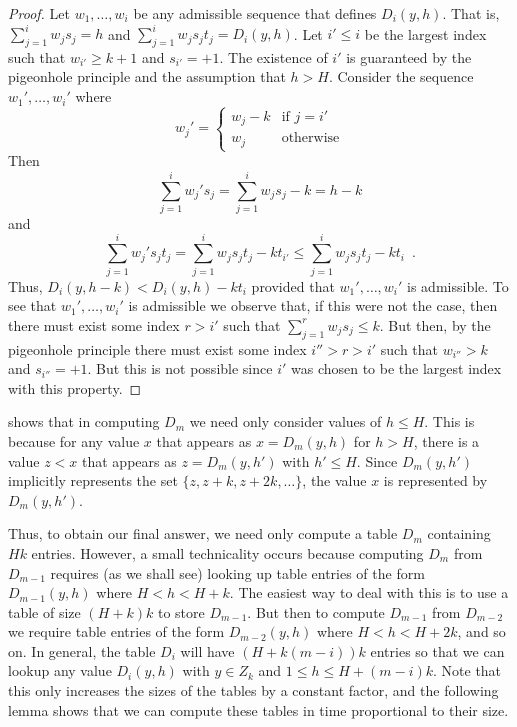 \documentclass[11pt,a4paper]{article}
\begin{document}
\begin{proof}
Let $w_1,\ldots,w_i$ be any admissible sequence that defines
$D_i(y,h)$.  That is,  $\sum_{j=1}^iw_js_j = h$ and $\sum_{j=1}^i w_js_jt_j
= D_i(y,h)$.  Let $i'\le i$ be the largest index such that
$w_{i'}\ge k+1$ and $s_{i'}=+1$.  The existence of $i'$ is guaranteed
by the pigeonhole principle and the
assumption that $h>H$.  Consider the sequence $w_1',\ldots,w_i'$ where
\[
     w_j' = \left\{ \begin{array}{ll}
            w_j-k & \mbox{if $j=i'$} \\
            w_j & \mbox{otherwise}  \end{array} \right.
\]
Then
\[
  \sum_{j=1}^i w_j's_j = \sum_{j=1}^i w_js_j - k = h-k
\]
and
\[
   \sum_{j=1}^i w_j's_jt_j = \sum_{j=1}^i w_js_jt_j - kt_{i'} 
    \le \sum_{j=1}^i w_js_jt_j - kt_{i} \enspace . 
\]
Thus, $D_i(y,h-k) < D_i(y,h) - kt_i$ provided that $w_1',\ldots,w_i'$
is admissible.  To see that $w_1',\ldots,w_i'$ is admissible we
observe that, if this were not the case, then there must exist some
index $r>i'$ such that $\sum_{j=1}^r w_js_j \le k$.  But then, by the
pigeonhole principle there
must exist some index $i''>r>i'$ such that $w_{i''}>k$ and
$s_{i''}=+1$.  But this is not possible since $i'$ was chosen to be
the largest index with this property.
\end{proof}

 shows that in computing $D_m$ we need only consider
values of $h\le H$.  This is because for any value $x$ that appears as
$x=D_m(y,h)$ for $h>H$, there is a value $z< x$ that appears as
$z=D_m(y,h')$ with $h'\le H$.  Since $D_m(y,h')$ implicitly represents the
set $\{z, z+k, z+2k,\ldots\}$, the value $x$ is represented by
$D_m(y,h')$.

Thus, to obtain our final answer, we need only compute a
table $D_m$ containing $Hk$ entries.  However, a small technicality
occurs because computing $D_m$ from $D_{m-1}$ requires (as we shall
see) looking up table entries of the form $D_{m-1}(y,h)$ where
$H<h<H+k$.  The easiest way to deal with this is to use a table of
size $(H+k)k$ to store $D_{m-1}$.  But then to compute $D_{m-1}$ from
$D_{m-2}$ we require table entries of the form $D_{m-2}(y,h)$ where
$H<h<H+2k$, and so on.  In general, the table $D_i$ will have
$(H+k(m-i))k$ entries so that we can lookup any value $D_i(y,h)$ with
$y\in Z_k$ and $1\le h\le H+(m-i)k$.  Note that this only increases
the sizes of the tables by a constant factor, and the following lemma
shows that we can compute these tables in time proportional to their
size.
\end{document}
